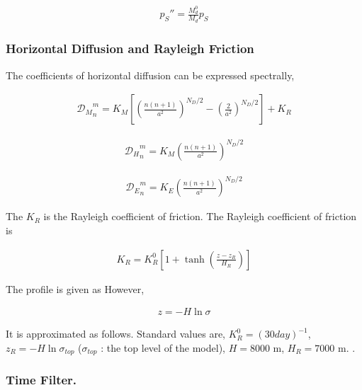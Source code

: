 \begin{eqnarray}
        p_S'' = \frac{M_d^0}{M_d} p_S
\end{eqnarray}

\hypertarget{horizontal-diffusion-and-rayleigh-friction}{%
\subsubsection{Horizontal Diffusion and Rayleigh
Friction}\label{horizontal-diffusion-and-rayleigh-friction}}

The coefficients of horizontal diffusion can be expressed spectrally,

\begin{eqnarray}
 {{\mathcal D}_M}_n^m = K_M 
                      \left[ \left( \frac{n(n+1)}{a^2} \right)^{N_D/2} 
                                - \left( \frac{2}{a^2} \right)^{N_D/2} 
                      \right]
                  + K_R
\end{eqnarray}

\begin{eqnarray}
  {{\mathcal D}_H}_n^m = K_M \left( \frac{n(n+1)}{a^2} \right)^{N_D/2} 
\end{eqnarray}

\begin{eqnarray}
  {{\mathcal D}_E}_n^m = K_E \left( \frac{n(n+1)}{a^2} \right)^{N_D/2} 
\end{eqnarray}

The \(K_R\) is the Rayleigh coefficient of friction. The Rayleigh
coefficient of friction is

\begin{eqnarray}
  K_R = K_R^0 \left[ 1+\tanh \left( \frac{z-z_R}{H_R} \right) \right]
\end{eqnarray}

The profile is given as However,

\begin{eqnarray}
  z = - H \ln \sigma 
\end{eqnarray}

It is approximated as follows. Standard values are,
\(K_R^0 = {(30day)}^{-1}\), \(z_R = -H \ln \sigma_{top}\)
(\(\sigma_{top}\) : the top level of the model), \(H = 8000\) m,
\(H_R = 7000\) m. .

\hypertarget{time-filter.}{%
\subsubsection{Time Filter.}\label{time-filter.}}

